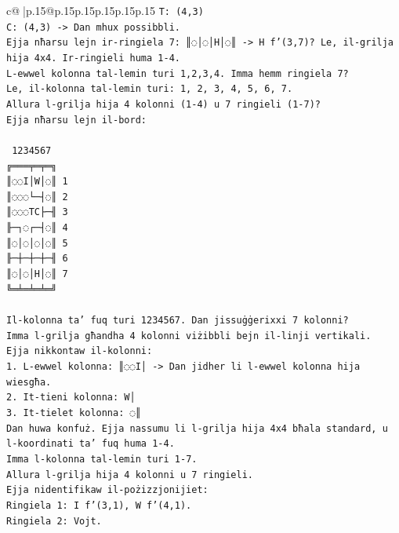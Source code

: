\documentclass{article}
\begin{document}
{\begin{supertabular}{c@{$\;$}|p{.15\linewidth}@{}p{.15\linewidth}p{.15\linewidth}p{.15\linewidth}p{.15\linewidth}p{.15\linewidth}}
{{{\texttt{T: (4,3)} \\
\texttt{C: (4,3) {-}> Dan mhux possibbli.} \\
\texttt{Ejja nħarsu lejn ir{-}ringiela 7: ║◌│◌│H│◌║ {-}> H f'(3,7)? Le, il{-}grilja hija 4x4. Ir{-}ringieli huma 1{-}4.} \\
\texttt{L{-}ewwel kolonna tal{-}lemin turi 1,2,3,4. Imma hemm ringiela 7?} \\
\texttt{Le, il{-}kolonna tal{-}lemin turi: 1, 2, 3, 4, 5, 6, 7.} \\
\texttt{Allura l{-}grilja hija 4 kolonni (1{-}4) u 7 ringieli (1{-}7)?} \\
\texttt{Ejja nħarsu lejn il{-}bord:} \\
\\ 
\texttt{ 1234567} \\
\texttt{╔═══╤═╤═╗} \\
\texttt{║◌◌I│W│◌║ 1} \\
\texttt{║◌◌◌└─┤◌║ 2} \\
\texttt{║◌◌◌TC├─╢ 3} \\
\texttt{╟─┐◌┌─┤◌║ 4} \\
\texttt{║◌│◌│◌│◌║ 5} \\
\texttt{╟─┼─┼─┼─╢ 6} \\
\texttt{║◌│◌│H│◌║ 7} \\
\texttt{╚═╧═╧═╧═╝} \\
\\ 
\texttt{Il{-}kolonna ta' fuq turi 1234567. Dan jissuġġerixxi 7 kolonni?} \\
\texttt{Imma l{-}grilja għandha 4 kolonni viżibbli bejn il{-}linji vertikali.} \\
\texttt{Ejja nikkontaw il{-}kolonni:} \\
\texttt{1. L{-}ewwel kolonna: ║◌◌I│ {-}> Dan jidher li l{-}ewwel kolonna hija wiesgħa.} \\
\texttt{2. It{-}tieni kolonna: W│} \\
\texttt{3. It{-}tielet kolonna: ◌║} \\
\texttt{Dan huwa konfuż. Ejja nassumu li l{-}grilja hija 4x4 bħala standard, u l{-}koordinati ta' fuq huma 1{-}4.} \\
\texttt{Imma l{-}kolonna tal{-}lemin turi 1{-}7.} \\
\texttt{Allura l{-}grilja hija 4 kolonni u 7 ringieli.} \\
\texttt{Ejja nidentifikaw il{-}pożizzjonijiet:} \\
\texttt{Ringiela 1: I f'(3,1), W f'(4,1).} \\
\texttt{Ringiela 2: Vojt.} \\
}}}
\end{supertabular}}
\end{document}
